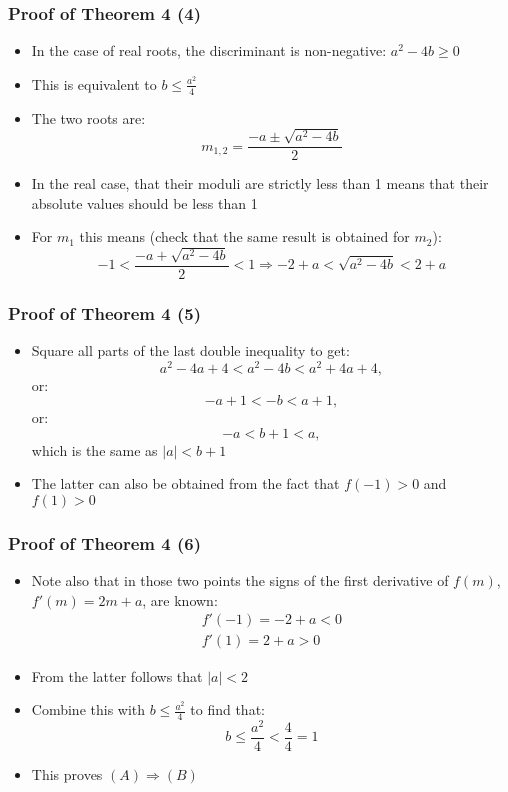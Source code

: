 \documentclass[10pt,usenames,dvipsnames]{beamer}
\theoremstyle{plain}
\theoremstyle{definition}
\begin{document}
\begin{frame}[fragile]
\frametitle{Proof of Theorem 4 (4)}
\begin{itemize}
	\item In the case of real roots, the discriminant is non-negative: $a^{2} - 4b \geq 0$
	\item This is equivalent to $\displaystyle b \leq \frac{a^{2}}{4}$
	\item The two roots are:
	\[
		m_{1,2} = \frac{-a \pm \sqrt{a^{2} - 4b}}{2}
	\]
	\item In the real case, that their moduli are strictly less than 1 means that their absolute values should be less than 1
	\item For $m_{1}$ this means (check that the same result is obtained for $m_{2}$):
	\[
		-1 < \frac{-a + \sqrt{a^{2} - 4b}}{2} < 1 \Rightarrow -2 + a < \sqrt{a^{2} - 4b} < 2 + a
	\]	
\end{itemize}
\end{frame}

\begin{frame}[fragile]
\frametitle{Proof of Theorem 4 (5)}
\begin{itemize}
	\item Square all parts of the last double inequality to get:
	\[
		a^{2} - 4a + 4 < a^{2} - 4b < a^{2} + 4a + 4, 
	\]
	or:
	\[
		- a + 1 < - b < a + 1,
	\]
	or:
	\[
		- a < b + 1 < a,
	\]
	which is the same as $|a| < b + 1$
	\item The latter can also be obtained from the fact that $f(-1) > 0$ and $f(1) > 0$
	
\end{itemize}
\end{frame}

\begin{frame}[fragile]
\frametitle{Proof of Theorem 4 (6)}
\begin{itemize}
	\item Note also that in those two points the signs of the first derivative of $f(m)$, $f'(m) = 2m + a$, are known:
	\[
		\begin{array}{lcl}
			f'(-1) = -2 + a < 0\\
			f'(1) = 2 + a > 0
		\end{array}
	\]
	\item From the latter follows that $|a| < 2$
	\item Combine this with $\displaystyle b \leq \frac{a^{2}}{4}$ to find that:
	\[
		b \leq \frac{a^{2}}{4} < \frac{4}{4} = 1
	\]
	\item This proves $(A) \Rightarrow (B)$
\end{itemize}
\end{frame}
\end{document}

